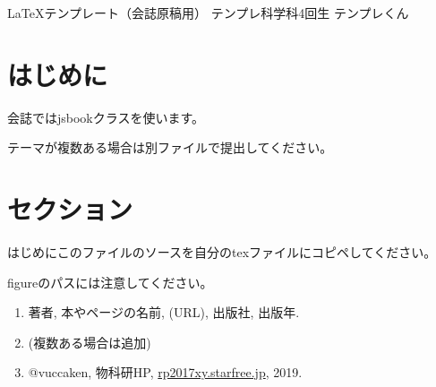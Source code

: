 \documentclass[10pt,b5paper,papersize,dvipdfmx]{jsbook}
\begin{document}

\kaishititle%
  {\LaTeX テンプレート（会誌原稿用）}%
  {テンプレ科学科4回生}%
  {テンプレくん}%


%
\section*{はじめに}
会誌ではjsbookクラスを使います。\par
テーマが複数ある場合は別ファイルで提出してください。

%
\section{セクション}
はじめにこのファイルのソースを自分のtexファイルにコピペしてください。\par
figureのパスには注意してください。


\begin{sanko}
  \begin{enumerate}
    \item 著者, 本やページの名前, (URL), 出版社, 出版年.
    \item (複数ある場合は追加)
    \item @vuccaken, 物科研HP, \url{rp2017xy.starfree.jp}, 2019.
  \end{enumerate}
\end{sanko}
\end{document}
